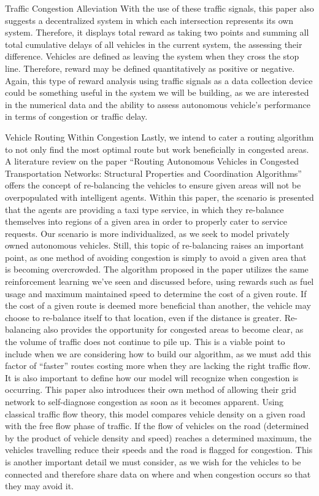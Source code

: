 \documentclass[letterpaper,10pt,draftclsnofoot,onecolumn]{IEEEtran} %
\begin{document}
\begin{section}{Traffic Congestion Alleviation}
With the use of these traffic signals, this paper also suggests a decentralized system in which each intersection
represents its own system. Therefore, it displays total reward as taking two points and summing all total cumulative
delays of all vehicles in the current system, the assessing their difference. Vehicles are defined as leaving the system
when they cross the stop line. Therefore, reward may be defined quantitatively as positive or negative. Again, this
type of reward analysis using traffic signals as a data collection device could be something useful in the system we
will be building, as we are interested in the numerical data and the ability to assess autonomous vehicle’s performance
in terms of congestion or traffic delay.
\end{section}

\begin{section}{Vehicle Routing Within Congestion}
Lastly, we intend to cater a routing algorithm to not only find the most optimal route but work beneficially
in congested areas. A literature review on the paper “Routing Autonomous Vehicles in Congested Transportation
Networks: Structural Properties and Coordination Algorithms”
\cite{Routing:2016} offers the concept of re-balancing the vehicles to
ensure given areas will not be overpopulated with intelligent agents. Within this paper, the scenario is presented that
the agents are providing a taxi type service, in which they re-balance themselves into regions of a given area in order
to properly cater to service requests. Our scenario is more individualized, as we seek to model privately owned
autonomous vehicles. Still, this topic of re-balancing raises an important point, as one method of avoiding congestion
is simply to avoid a given area that is becoming overcrowded. The algorithm proposed in the paper utilizes the same
reinforcement learning we've seen and discussed before, using rewards such as fuel usage and maximum maintained
speed to determine the cost of a given route. If the cost of a given route is deemed more beneficial than another, the
vehicle may choose to re-balance itself to that location, even if the distance is greater. Re-balancing also provides the
opportunity for congested areas to become clear, as the volume of traffic does not continue to pile up. This is a viable
point to include when we are considering how to build our algorithm, as we must add this factor of “faster” routes
costing more when they are lacking the right traffic flow.
It is also important to define how our model will recognize when congestion is occurring. This paper also
introduces their own method of allowing their grid network to self-diagnose congestion as soon as it becomes apparent.
Using classical traffic flow theory, this model compares vehicle density on a given road with the free flow phase of
traffic. If the flow of vehicles on the road (determined by the product of vehicle density and speed) reaches a
determined maximum, the vehicles travelling reduce their speeds and the road is flagged for congestion. This is another
important detail we must consider, as we wish for the vehicles to be connected and therefore share data on where and
when congestion occurs so that they may avoid it.
\end{section}	
\end{document}
